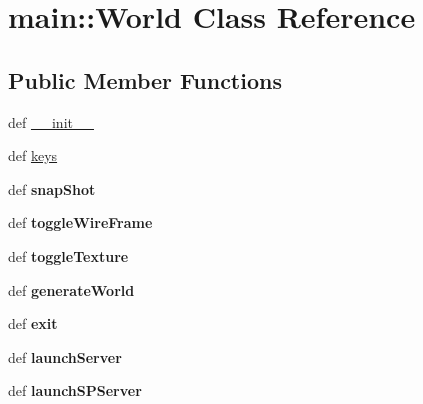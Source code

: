 \hypertarget{classmain_1_1World}{
\section{main::World Class Reference}
\label{classmain_1_1World}
}
\subsection*{Public Member Functions}
\begin{DoxyCompactItemize}
\item 
def \hyperlink{classmain_1_1World_ac3410c22682621f6871ac8335cd7ea4c}{\_\-\_\-init\_\-\_\-}
\item 
def \hyperlink{classmain_1_1World_a19bea80571776e75d868e8003290f329}{keys}
\item 
\hypertarget{classmain_1_1World_ab74ddb78da1ee187430762fcc02c0c40}{
def {\bfseries snapShot}}
\label{classmain_1_1World_ab74ddb78da1ee187430762fcc02c0c40}

\item 
\hypertarget{classmain_1_1World_aa6dd0b94277b6715ea7562f4243e5817}{
def {\bfseries toggleWireFrame}}
\label{classmain_1_1World_aa6dd0b94277b6715ea7562f4243e5817}

\item 
\hypertarget{classmain_1_1World_a0dc83bcf6c2a730647c1973629751d31}{
def {\bfseries toggleTexture}}
\label{classmain_1_1World_a0dc83bcf6c2a730647c1973629751d31}

\item 
\hypertarget{classmain_1_1World_a18076172e914c64e901a5489e6569e6a}{
def {\bfseries generateWorld}}
\label{classmain_1_1World_a18076172e914c64e901a5489e6569e6a}

\item 
\hypertarget{classmain_1_1World_a4233a2df4e909b17811b7846afa143fe}{
def {\bfseries exit}}
\label{classmain_1_1World_a4233a2df4e909b17811b7846afa143fe}

\item 
\hypertarget{classmain_1_1World_a8abe4cf828454df7c49bb518eb2152b7}{
def {\bfseries launchServer}}
\label{classmain_1_1World_a8abe4cf828454df7c49bb518eb2152b7}

\item 
\hypertarget{classmain_1_1World_a8257e86f1b2ce59c935ff7546ab461d9}{
def {\bfseries launchSPServer}}
\label{classmain_1_1World_a8257e86f1b2ce59c935ff7546ab461d9}

\end{DoxyCompactItemize}
